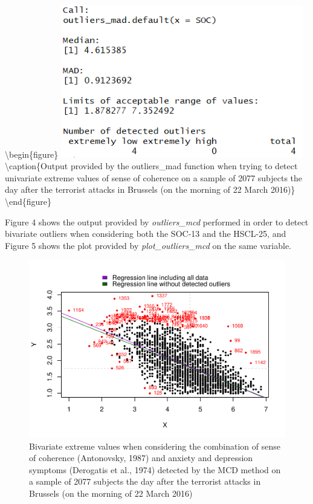\documentclass[man,floatsintext]{apa6}
\begin{document}
\textbackslash{}begin\{figure\}
\includegraphics[width=400px]{Rmarkdown folder/Fig 3} \textbackslash{}caption\{Output provided by the outliers\_mad function when trying to detect univariate extreme values of sense of coherence on a sample of 2077 subjects the day after the terrorist attacks in Brussels (on the morning of 22 March 2016)\}\label{fig:unnamed-chunk-1}
\textbackslash{}end\{figure\}

Figure 4 shows the output provided by \emph{outliers\_mcd} performed in order to detect bivariate outliers when considering both the SOC-13 and the HSCL-25, and Figure 5 shows the plot provided by \emph{plot\_outliers\_mcd} on the same variable.

\begin{figure}
\centering
\includegraphics{Outliers_files/figure-latex/MCDSOC-1.pdf}
\caption{\label{fig:MCDSOC}Bivariate extreme values when considering the combination of sense of coherence (Antonovsky, 1987) and anxiety and depression symptoms (Derogatis et al., 1974) detected by the MCD method on a sample of 2077 subjects the day after the terrorist attacks in Brussels (on the morning of 22 March 2016)}
\end{figure}
\end{document}
